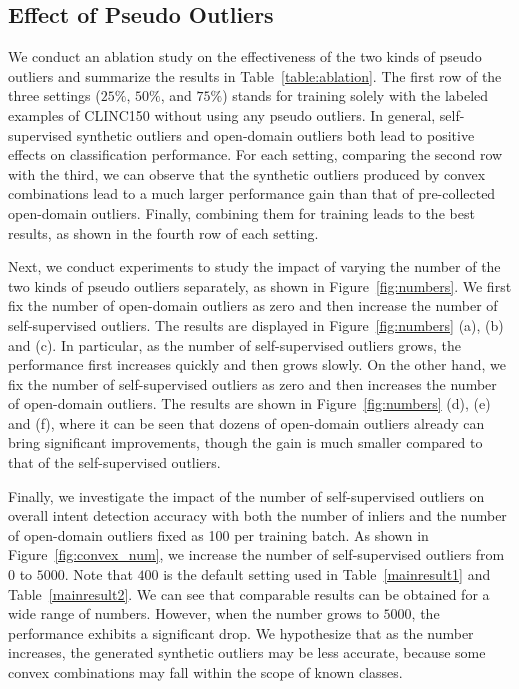 \subsection{Effect of Pseudo Outliers}
We conduct an ablation study on the effectiveness of the two kinds of pseudo outliers and summarize the results in Table~\ref{table:ablation}. The first row of the three settings ($25\%$, $50\%$, and $75\%$) stands for training solely with the labeled examples of CLINC150 without using any pseudo outliers. In general, self-supervised synthetic outliers and open-domain outliers both lead to positive effects on classification performance. For each setting, comparing the second row with the third, we can observe that the synthetic outliers produced by convex combinations lead to a much larger performance gain than that of pre-collected open-domain outliers. Finally, combining them for training leads to the best results, as shown in the fourth row of each setting.

Next, we conduct experiments to study the impact of varying the number of the two kinds of pseudo outliers separately, as shown in Figure~\ref{fig:numbers}. We first fix the number of open-domain outliers as zero and then increase the number of self-supervised outliers. The results are displayed in Figure~\ref{fig:numbers} (a), (b) and (c). In particular, as the number of self-supervised outliers grows, the performance first increases quickly and then grows slowly. On the other hand, we fix the number of self-supervised outliers as zero and then increases the number of open-domain outliers. The results are shown in Figure~\ref{fig:numbers}  (d), (e) and (f), where it can be seen that dozens of open-domain outliers already can bring significant improvements, though the gain is much smaller compared to that of the self-supervised outliers.

Finally, we investigate the impact of the number of self-supervised outliers on overall intent detection accuracy with both the number of inliers and the number of open-domain outliers fixed as 100 per training batch. %
As shown in Figure~\ref{fig:convex_num}, we increase the number of self-supervised outliers from 0 to $5000$. Note that $400$ is the default setting used in Table~\ref{mainresult1} and Table~\ref{mainresult2}. We can see that comparable results can be obtained for a wide range of numbers. However, when the number grows to $5000$, the performance exhibits a significant drop. We hypothesize that as the number increases, the generated synthetic outliers may be less accurate, because some convex combinations may fall within the scope of known classes.


